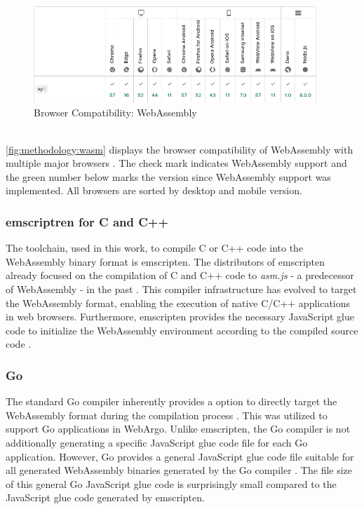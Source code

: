 \begin{figure}[htbp]
  \centering
  \includegraphics[width=0.95\textwidth]{gfx/figures/webassembly-browsercompability.png}
  \caption{Browser Compatibility: WebAssembly \cite{methodology:wasmdocu}}
  \label{fig:methodology:wasm}
\end{figure}
~\\
\autoref{fig:methodology:wasm} displays the browser compatibility of WebAssembly with multiple major browsers \cite{methodology:wasmdocu}. The check mark indicates WebAssembly support and the green number below marks the version since WebAssembly support was implemented. All browsers are sorted by desktop and mobile version. 

\subsubsection{emscriptren for C and C++}
\label{subsec:methodology:wasm:cpp}
The toolchain, used in this work, to compile C or C++ code into the WebAssembly binary format is emscripten. The distributors of emscripten already focused on the compilation of C and C++ code to \emph{asm.js} - a predecessor of WebAssembly - in the past \cite{methodology:emcc}. This compiler infrastructure has evolved to target the WebAssembly format, enabling the execution of native C/C++ applications in web browsers. Furthermore, emscripten provides the necessary JavaScript glue code to initialize the WebAssembly environment according to the compiled source code \cite{methodology:emcc}.

\subsubsection{Go}
\label{subsec:methodology:wasm:go}
The standard Go compiler inherently provides a option to directly target the WebAssembly format during the compilation process \cite{methodology:go}. This was utilized to support Go applications in WebArgo. Unlike emscripten, the Go compiler is not additionally generating a specific JavaScript glue code file for each Go application. However, Go provides a general JavaScript glue code file suitable for all generated WebAssembly binaries generated by the Go compiler \cite{methodology:go}. The file size of this general Go JavaScript glue code is surprisingly small compared to the JavaScript glue code generated by emscripten.

